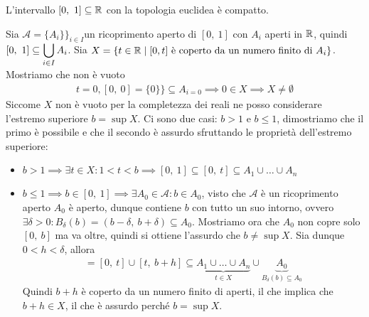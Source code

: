 \begin{theorema}
	L'intervallo $[0,\ 1]\subseteq\realset$ con la topologia euclidea è compatto.
\end{theorema}
\begin{demonstration}
	Sia $\mathcal{A}=\{ A_i\}\}_{i\in I}$un ricoprimento aperto di $[0,\ 1]$ con $A_i$ aperti in $\mathbb{R}$, quindi $\displaystyle [0,\ 1]\subseteq\mathop{{\bigcup}}\displaylimits_{i\in I}A_i$.\newline 
	Sia $X=\{ t\in\mathbb{R} \mid [0,t] \text{ è coperto da un numero finito di } A_i \}$. Mostriamo che non è vuoto
		\begin{gather*}
			t=0, [0,\ 0]=\{0\}\} \subseteq A_{i=0} \implies 0\in X\implies X\neq\emptyset
		\end{gather*}
	Siccome $X$ non è vuoto per la completezza dei reali ne posso considerare l'estremo superiore $b=\sup X$. Ci sono due casi: $b>1$  e $b\leq 1$, dimostriamo che il primo è possibile e che il secondo è assurdo sfruttando le proprietà dell'estremo superiore:
		\begin{itemize}
			\item $b>1 \implies \exists t\in X \colon 1<t<b \implies [0,\ 1]\subseteq [0,\ t] \subseteq A_1\cup \dots \cup A_n$
			\item $b\leq 1 \implies b\in [0,\ 1] \implies \exists A_0\in\mathcal{A} \colon b\in A_0$, visto che $\mathcal{A}$ è un ricoprimento aperto $A_0$ è aperto, dunque contiene $b$ con tutto un suo intorno, ovvero \\ $\exists \delta >0 \colon B_\delta (b)=(b-\delta, \ b+\delta )\subseteq A_0$. Mostriamo ora che $A_0$ non copre solo $[0,\ b]$ ma va oltre, quindi si ottiene l'assurdo che $b\neq\sup X$. Sia dunque $0<h<\delta$, allora 
				\begin{gather*}
					[0,\b+h]=[0,\ t]\cup [t,\ b+h]\subseteq \underbrace{A_1\cup\dots\cup A_n}_{t\in X}\cup \underbrace{A_0}_{B_\delta (b)\subseteq A_0}
				\end{gather*}	
			Quindi $b+h$ è coperto da un numero finito di aperti, il che implica che $b+h\in X$, il che è assurdo perché $b=\sup X$.
		\end{itemize}
\end{demonstration}

